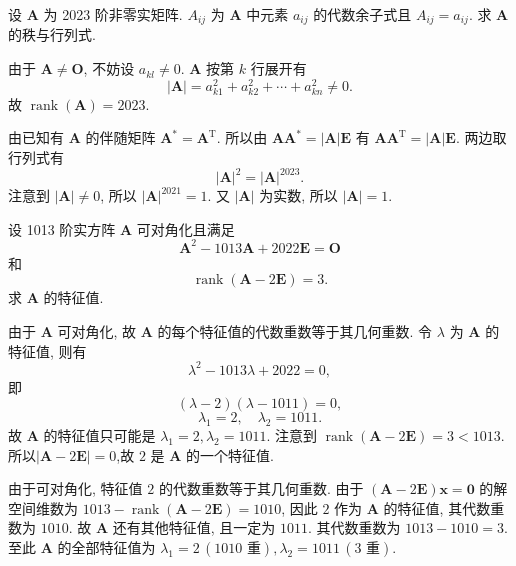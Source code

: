 \documentclass[../../main.tex]{subfiles}
\begin{document}
\begin{example}
设 \(\boldsymbol{A}\) 为 2023 阶非零实矩阵. \(A_{ij}\) 为 \(\boldsymbol{A}\) 中元素 \(a_{ij}\) 的代数余子式且 \(A_{ij} = a_{ij}\). 求 \(\boldsymbol{A}\) 的秩与行列式.
\end{example}
\begin{solution}
由于 \(\boldsymbol{A} \neq \boldsymbol{O}\), 不妨设 \(a_{kl} \neq 0\). \(\boldsymbol{A}\) 按第 \(k\) 行展开有
\[
|\boldsymbol{A}| = a_{k1}^2 + a_{k2}^2 + \cdots + a_{kn}^2 \neq 0.
\]
故 \(\operatorname{rank}(\boldsymbol{A}) = 2023\).

由已知有 \(\boldsymbol{A}\) 的伴随矩阵 \(\boldsymbol{A}^* = \boldsymbol{A}^\mathrm{T}\). 所以由 \(\boldsymbol{A}\boldsymbol{A}^* = |\boldsymbol{A}|\boldsymbol{E}\) 有 \(\boldsymbol{A}\boldsymbol{A}^\mathrm{T} = |\boldsymbol{A}|\boldsymbol{E}\). 两边取行列式有
\[
|\boldsymbol{A}|^2 = |\boldsymbol{A}|^{2023}.
\]
注意到 \(|\boldsymbol{A}| \neq 0\), 所以 \(|\boldsymbol{A}|^{2021} = 1\). 又 \(|\boldsymbol{A}|\) 为实数, 所以 \(|\boldsymbol{A}| = 1\).

\end{solution}

\begin{example}
设 1013 阶实方阵 \(\boldsymbol{A}\) 可对角化且满足
\[
\boldsymbol{A}^2 - 1013\boldsymbol{A} + 2022\boldsymbol{E} = \boldsymbol{O}
\]
和
\[
\operatorname{rank}(\boldsymbol{A} - 2\boldsymbol{E}) = 3.
\]
求 \(\boldsymbol{A}\) 的特征值.
\end{example}
\begin{solution}
由于 \(\boldsymbol{A}\) 可对角化, 故 \(\boldsymbol{A}\) 的每个特征值的代数重数等于其几何重数. 令 \(\lambda\) 为 \(\boldsymbol{A}\) 的特征值, 则有
\[
\lambda^2 - 1013\lambda + 2022 = 0,
\]
即
\[
(\lambda - 2)(\lambda - 1011) = 0,
\]
\[
\lambda_1 = 2, \quad \lambda_2 = 1011.
\]
故 \(\boldsymbol{A}\) 的特征值只可能是 \(\lambda_1 = 2, \lambda_2 = 1011\). 注意到 \(\operatorname{rank}(\boldsymbol{A} - 2\boldsymbol{E}) = 3 < 1013\). 所以$|\boldsymbol{A} - 2\boldsymbol{E}|=0$,故 \(2\) 是 \(\boldsymbol{A}\) 的一个特征值.

由于可对角化, 特征值 \(2\) 的代数重数等于其几何重数. 由于 \((\boldsymbol{A} - 2\boldsymbol{E})\boldsymbol{x} = \boldsymbol{0}\) 的解空间维数为 \(1013 - \operatorname{rank}(\boldsymbol{A} - 2\boldsymbol{E}) = 1010\), 因此 \(2\) 作为 \(\boldsymbol{A}\) 的特征值, 其代数重数为 \(1010\). 故 \(\boldsymbol{A}\) 还有其他特征值, 且一定为 \(1011\). 其代数重数为 \(1013 - 1010 = 3\). 至此 \(\boldsymbol{A}\) 的全部特征值为 \(\lambda_1 = 2 \, (1010 \text{ 重}), \lambda_2 = 1011 \, (3 \text{ 重})\).

\end{solution}
\end{document}
